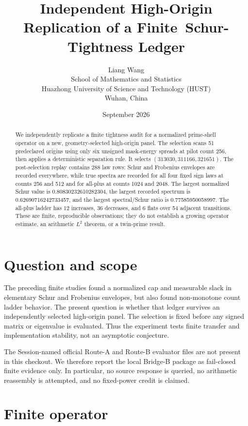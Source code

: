 \documentclass[10pt]{article}
\title{Independent High-Origin Replication of a Finite\
       Schur-Tightness Ledger}
\author{Liang Wang\\
\small School of Mathematics and Statistics\\
\small Huazhong University of Science and Technology (HUST)\\
\small Wuhan, China}
\date{September 2026}
\begin{document}
\maketitle

\begin{abstract}
We independently replicate a finite tightness audit for a normalized
prime-shell operator on a new, geometry-selected high-origin panel.  The
selection scans 51 predeclared origins using only six unsigned mask-energy
spreads at pilot count 256, then applies a deterministic separation rule.  It
selects $(313030,311166,321651)$.  The post-selection replay contains 288 law
rows: Schur and Frobenius envelopes are recorded everywhere, while true
spectra are recorded for all four fixed sign laws at counts 256 and 512 and
for all-plus at counts 1024 and 2048.  The largest normalized Schur value is
0.80830232610282304, the largest recorded spectrum is
0.62690716242733457, and the largest spectral/Schur ratio is
0.77585950058997.  The all-plus ladder has 12 increases, 36 decreases, and 6
flats over 54 adjacent transitions.  These are finite, reproducible
observations; they do not establish a growing operator estimate, an
arithmetic $L^2$ theorem, or a twin-prime result.
\end{abstract}

\section{Question and scope}

The preceding finite studies found a normalized cap and measurable slack in
elementary Schur and Frobenius envelopes, but also found non-monotone count
ladder behavior.  The present question is whether that ledger survives an
independently selected high-origin panel.  The selection is fixed before any
signed matrix or eigenvalue is evaluated.  Thus the experiment tests finite
transfer and implementation stability, not an asymptotic conjecture.

The Session-named official Route-A and Route-B evaluator files are not present
in this checkout.  We therefore report the local Bridge-B package as
fail-closed finite evidence only.  In particular, no source response is
queried, no arithmetic reassembly is attempted, and no fixed-power credit is
claimed.

\section{Finite operator}
\end{document}

